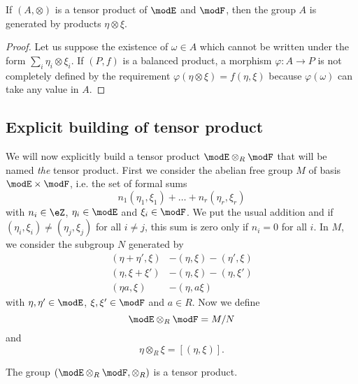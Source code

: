 \begin{proposition}
If $(A,\otimes)$ is a tensor product of $\modE$ and $\modF$, then the group $A$ is generated by products $\eta\otimes\xi$.
\end{proposition}

\begin{proof}
Let us suppose the existence of $\omega\in A$ which cannot be written under the form $\sum_i\eta_i\otimes\xi_i$. If $(P,f)$ is a balanced product, a morphism $\varphi\colon A\to P$ is not completely defined by the requirement $\varphi(\eta\otimes\xi)=f(\eta,\xi)$ because $\varphi(\omega)$ can take any value in $A$.

\end{proof} 

\subsection{Explicit building of tensor product}

We will now explicitly build a tensor product $\modE\otimes_R\modF$ that will be named \emph{the} tensor product. First we consider the abelian free group $M$ of basis $\modE\times\modF$, i.e. the set of formal sums
\[ 
  n_1(\eta_1,\xi_1)+\ldots+n_r(\eta_r,\xi_r)
\]
with $n_i\in\eZ$, $\eta_i\in\modE$ and $\xi_i\in\modF$. We put the usual addition and if $(\eta_i,\xi_i)\neq(\eta_j,\xi_j)$ for all $i\neq j$, this sum is zero only if $n_i=0$ for all $i$. In $M$, we consider the subgroup $N$ generated by
\begin{subequations}
\begin{align}
(\eta+\eta',\xi)&-(\eta,\xi)-(\eta',\xi)\\
(\eta,\xi+\xi')&-(\eta,\xi)-(\eta,\xi')\\
(\eta a,\xi)&-(\eta, a\xi)
\end{align}
\end{subequations}
with $\eta,\eta'\in\modE$, $\xi,\xi'\in\modF$ and $a\in R$. Now we define 
\begin{equation}
\modE\otimes_R\modF=M/N
\end{equation}
and 
\begin{equation}
\eta\otimes_R\xi=[(\eta,\xi)].
\end{equation}

\begin{proposition}
The group $(\modE\otimes_R\modF,\otimes_R)$ is a tensor product.
\end{proposition}

